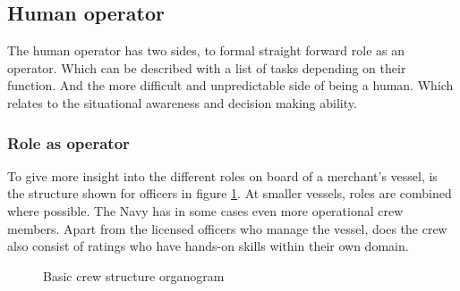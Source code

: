 \subsection{Human operator}
The human operator has two sides, to formal straight forward role as an operator. Which can be described with a list of tasks depending on their function. And the more difficult and unpredictable side of being a human. Which relates to the situational awareness and decision making ability.

\subsubsection{Role as operator}
\label{sec:deck-crew}
To give more insight into the different roles on board of a merchant's vessel, is the structure shown for officers in figure \ref{fig:crew-structure}. At smaller vessels, roles are combined where possible. The Navy has in some cases even more operational crew members. Apart from the licensed officers who manage the vessel, does the crew also consist of ratings who have hands-on skills within their own domain. \cite{Nedcon2013}


\begin{figure}[p]
	\centering
	\caption{Basic crew structure organogram}
	\label{fig:crew-structure}
\end{figure}

